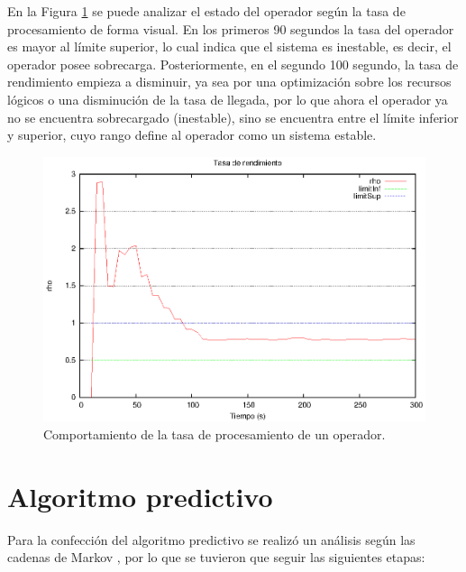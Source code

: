 En la Figura \ref{fig:umbrales} se puede analizar el estado del operador según la tasa de procesamiento de forma visual. En los primeros 90 segundos la tasa del operador es mayor al límite superior, lo cual indica que el sistema es inestable, es decir, el operador posee sobrecarga. Posteriormente, en el segundo 100 segundo, la tasa de rendimiento empieza a disminuir, ya sea por una optimización sobre los recursos lógicos o una disminución de la tasa de llegada, por lo que ahora el operador ya no se encuentra sobrecargado (inestable), sino se encuentra entre el límite inferior y superior, cuyo rango define al operador como un sistema estable.

\begin{figure}[hb!]
  \centering
    \includegraphics[scale=0.8]{images/Umbrales.eps}
  \caption{Comportamiento de la tasa de procesamiento de un operador.}
  \label{fig:umbrales}
\end{figure}


\section{Algoritmo predictivo}
Para la confección del algoritmo predictivo se realizó un análisis según las cadenas de Markov \citep{ching2006markov}, por lo que se tuvieron que seguir las siguientes etapas:

